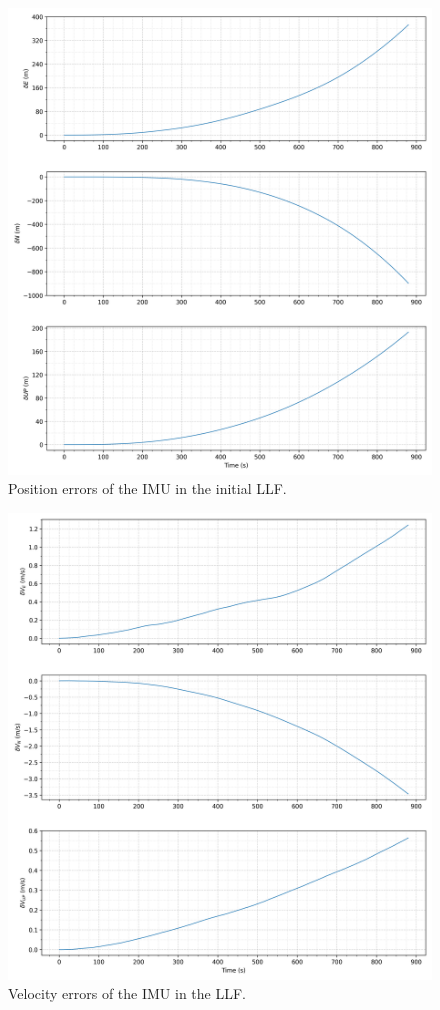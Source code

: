 \documentclass[11pt, oneside]{article}   	%
\begin{document}
\begin{figure}[!htbp]
\centerline{\includegraphics[width=16cm]{img/position_errors.png}}
\caption{\label{fig:position-errors} Position errors of the IMU in the initial LLF.}
\end{figure}

\begin{figure}[!htbp]
\centerline{\includegraphics[width=16cm]{img/velocity_errors.png}}
\caption{\label{fig:velocity-errors} Velocity errors of the IMU in the LLF.}
\end{figure}
\end{document}
